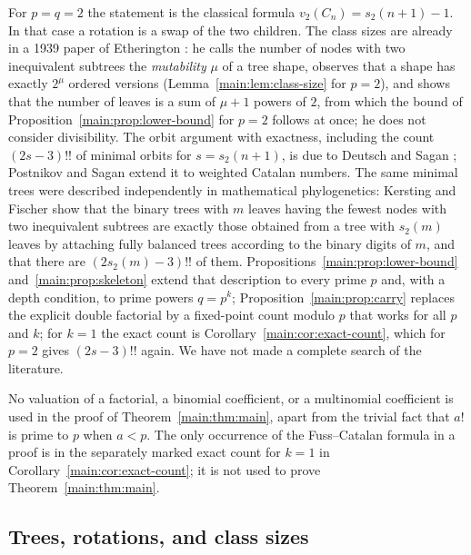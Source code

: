 \documentclass[11pt]{article}
\theoremstyle{definition}
\theoremstyle{remark}
\numberwithin{equation}{section}
\numberwithin{figure}{section}
\begin{document}
For $p=q=2$ the statement is the classical formula $v_2(C_n)=s_2(n+1)-1$.  In that case a rotation is a swap of the two children.  The class sizes are already in a 1939 paper of Etherington \cite{Etherington}: he calls the number of nodes with two inequivalent subtrees the \emph{mutability} $\mu$ of a tree shape, observes that a shape has exactly $2^{\mu}$ ordered versions (Lemma~\ref{main:lem:class-size} for $p=2$), and shows that the number of leaves is a sum of $\mu+1$ powers of $2$, from which the bound of Proposition~\ref{main:prop:lower-bound} for $p=2$ follows at once; he does not consider divisibility.  The orbit argument with exactness, including the count $(2s-3)!!$ of minimal orbits for $s=s_2(n+1)$, is due to Deutsch and Sagan \cite{DeutschSagan}; Postnikov and Sagan \cite{PostnikovSagan} extend it to weighted Catalan numbers.  The same minimal trees were described independently in mathematical phylogenetics: Kersting and Fischer \cite{KerstingFischer} show that the binary trees with $m$ leaves having the fewest nodes with two inequivalent subtrees are exactly those obtained from a tree with $s_2(m)$ leaves by attaching fully balanced trees according to the binary digits of $m$, and that there are $(2s_2(m)-3)!!$ of them.  Propositions~\ref{main:prop:lower-bound} and~\ref{main:prop:skeleton} extend that description to every prime $p$ and, with a depth condition, to prime powers $q=p^k$; Proposition~\ref{main:prop:carry} replaces the explicit double factorial by a fixed-point count modulo $p$ that works for all $p$ and $k$; for $k=1$ the exact count is Corollary~\ref{main:cor:exact-count}, which for $p=2$ gives $(2s-3)!!$ again.  We have not made a complete search of the literature.

No valuation of a factorial, a binomial coefficient, or a multinomial coefficient is used in the proof of Theorem~\ref{main:thm:main}, apart from the trivial fact that $a!$ is prime to $p$ when $a<p$.  The only occurrence of the Fuss--Catalan formula in a proof is in the separately marked exact count for $k=1$ in Corollary~\ref{main:cor:exact-count}; it is not used to prove Theorem~\ref{main:thm:main}.

\subsection{Trees, rotations, and class sizes}
\end{document}
